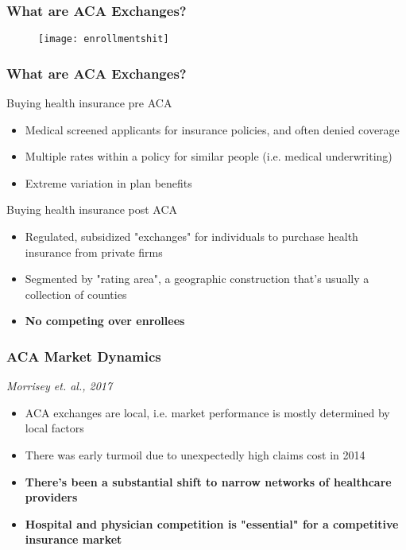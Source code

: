 \documentclass{beamer}
\begin{document}
\begin{frame}
\frametitle{What are ACA Exchanges?}
\begin{figure}
\texttt{[image: enrollmentshit]}
\end{figure}
\end{frame}


\begin{frame}
\frametitle{What are ACA Exchanges?}

\begin{block}{Buying health insurance pre ACA}
\begin{itemize}
\item Medical screened applicants for insurance policies, and often denied coverage
\item Multiple rates within a policy for similar people (i.e. medical underwriting)
\item Extreme variation in plan benefits
\end{itemize}
\end{block}

\begin{block}{Buying health insurance post ACA}
\begin{itemize}
\item Regulated, subsidized "exchanges" for individuals to purchase health insurance from private firms
\item Segmented by "rating area", a geographic construction that's usually a collection of counties
\item \textbf{No competing over enrollees}
\end{itemize}
\end{block}

\end{frame}


\begin{frame}
\frametitle{ACA Market Dynamics}
\textit{Morrisey et. al., 2017}
\begin{itemize}
\item ACA exchanges are local, i.e. market performance is mostly determined by local factors
\item There was early turmoil due to unexpectedly high claims cost in 2014
\item \textbf{There's been a substantial shift to narrow networks of healthcare providers}
\item \textbf{Hospital and physician competition is "essential" for a competitive insurance market}
\end{itemize}
\end{frame}
\end{document}
